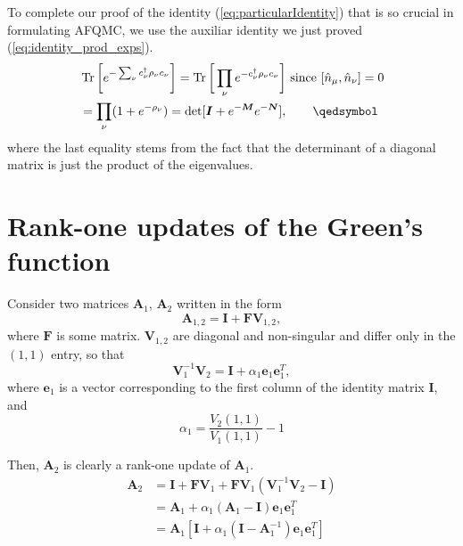 To complete our proof of the identity (\ref{eq:particularIdentity}) that is so crucial in formulating AFQMC, we use the auxiliar identity we just proved (\ref{eq:identity_prod_exps}).
\begin{equation}\label{eq:completeProof}
\begin{split}
&\Tr \bigg[ e^{-\sum_\nu c_\nu^\dagger \rho_\nu c_\nu} \bigg] = \Tr \bigg[ \prod_\nu e^{-c_\nu^\dagger \rho_\nu c_\nu } \bigg] \text{  since  } [\hat{n}_\mu, \hat{n}_\nu] = 0 \\
&= \prod_\nu ( 1 + e^{-\rho_\nu} ) = \text{det} [ \bm I + e^{-\bm M} e^{-\bm N} ], \quad\quad \qedsymbol
\end{split}
\end{equation}
where the last equality stems from the fact that the determinant of a diagonal matrix is just the product of the eigenvalues.

\section{Rank-one updates of the Green's function}\label{sec:greenUpdate}

Consider two matrices $\bm A_1$, $\bm A_2$ written in the form
\begin{equation}
\bm A_{1,2} = \bm I + \bm F \bm V_{1,2} ,
\end{equation}
where $\bm F$ is some matrix. $\bm V_{1,2}$ are diagonal and non-singular and differ only in the $(1,1)$ entry, so that
\begin{equation}
\bm V_1^{-1} \bm V_2 = \bm I + \alpha_1 \bm e_1 \bm e_1^T ,
\end{equation}
where $\bm e_1$ is a vector corresponding to the first column of the identity matrix $\bm I$, and
\begin{equation}
\alpha_1 = \frac{V_2(1,1)}{V_1(1,1)} - 1
\end{equation}

Then, $\bm A_2$ is clearly a rank-one update of $\bm A_1$.
\begin{equation}\label{eq:a2}
\begin{split}
\bm A_2 &= \bm I + \bm F \bm V_1 + \bm F \bm V_1 ( \bm V_1^{-1} \bm V_2 - \bm I ) \\
&= \bm A_1 + \alpha_1 ( \bm A_1 - \bm I ) \bm e_1 \bm e_1^T \\
&= \bm A_1 [ \bm I + \alpha_1 ( \bm I - \bm A_1^{-1} )\bm e_1 \bm e_1^T ]
\end{split}
\end{equation}


